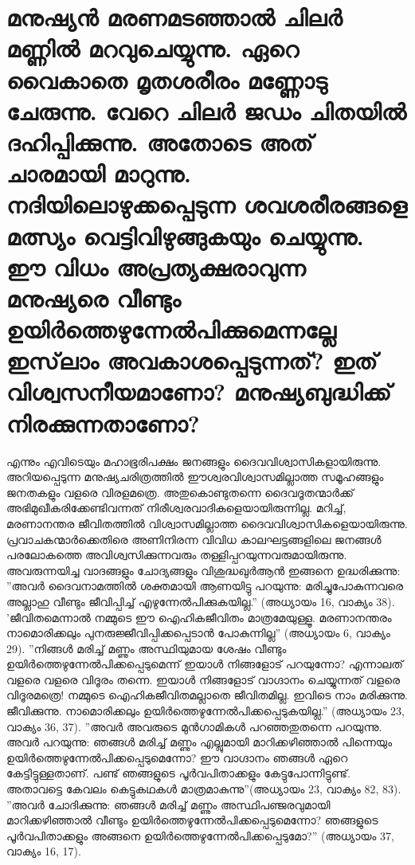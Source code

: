   \section{മനുഷ്യന്‍ മരണമടഞ്ഞാല്‍ ചിലര്‍ മണ്ണില്‍ മറവുചെയ്യുന്നു. ഏറെ വൈകാതെ മൃതശരീരം മണ്ണോടു ചേരുന്നു. വേറെ ചിലര്‍ ജഡം ചിതയില്‍ ദഹിപ്പിക്കുന്നു. അതോടെ അത് ചാരമായി മാറുന്നു. നദിയിലൊഴുക്കപ്പെടുന്ന ശവശരീരങ്ങളെ മത്സ്യം വെട്ടിവിഴുങ്ങുകയും ചെയ്യുന്നു. ഈ വിധം അപ്രത്യക്ഷരാവുന്ന മനുഷ്യരെ വീണ്ടും ഉയിര്‍ത്തെഴുന്നേല്‍പിക്കുമെന്നല്ലേ ഇസ്‌ലാം അവകാശപ്പെടുന്നത്? ഇത് വിശ്വസനീയമാണോ? മനുഷ്യബുദ്ധിക്ക് നിരക്കുന്നതാണോ?}
 എന്നും എവിടെയും മഹാഭൂരിപക്ഷം ജനങ്ങളും ദൈവവിശ്വാസികളായിരുന്നു. അറിയപ്പെടുന്ന മനുഷ്യചരിത്രത്തില്‍ ഈശ്വരവിശ്വാസമില്ലാത്ത സമൂഹങ്ങളും ജനതകളും വളരെ വിരളമത്രെ. അതുകൊണ്ടുതന്നെ ദൈവദൂതന്മാര്‍ക്ക് അഭിമുഖീകരിക്കേണ്ടിവന്നത് നിരീശ്വരവാദികളെയായിരുന്നില്ല. മറിച്ച്, മരണാനന്തര ജീവിതത്തില്‍ വിശ്വാസമില്ലാത്ത ദൈവവിശ്വാസികളെയായിരുന്നു. പ്രവാചകന്മാര്‍ക്കെതിരെ അണിനിരന്ന വിവിധ കാലഘട്ടങ്ങളിലെ ജനങ്ങള്‍ പരലോകത്തെ അവിശ്വസിക്കുന്നവരും തള്ളിപ്പറയുന്നവരുമായിരുന്നു. അവരുന്നയിച്ച വാദങ്ങളും ചോദ്യങ്ങളും വിശുദ്ധഖുര്‍ആന്‍ ഇങ്ങനെ ഉദ്ധരിക്കുന്നു:
''അവര്‍ ദൈവനാമത്തില്‍ ശക്തമായി ആണയിട്ടു പറയുന്നു: മരിച്ചുപോകുന്നവരെ അല്ലാഹു വീണ്ടും ജീവിപ്പിച്ച് എഴുന്നേല്‍പിക്കുകയില്ല.'' (അധ്യായം 16, വാക്യം 38).
'ജീവിതമെന്നാല്‍ നമ്മുടെ ഈ ഐഹികജീവിതം മാത്രമേയുള്ളൂ. മരണാനന്തരം നാമൊരിക്കലും പുനരുജ്ജീവിപ്പിക്കപ്പെടാന്‍ പോകുന്നില്ല'' (അധ്യായം 6, വാക്യം 29).
''നിങ്ങള്‍ മരിച്ച് മണ്ണും അസ്ഥിയുമായ ശേഷം വീണ്ടും ഉയിര്‍ത്തെഴുന്നേല്‍പിക്കപ്പെടുമെന്ന് ഇയാള്‍ നിങ്ങളോട് പറയുന്നോ? എന്നാലത് വളരെ വളരെ വിദൂരം തന്നെ. ഇയാള്‍ നിങ്ങളോട് വാഗ്ദാനം ചെയ്യുന്നത് വളരെ വിദൂരമത്രെ! നമ്മുടെ ഐഹികജീവിതമല്ലാതെ ജീവിതമില്ല. ഇവിടെ നാം മരിക്കുന്നു. ജീവിക്കുന്നു. നാമൊരിക്കലും ഉയിര്‍ത്തെഴുന്നേല്‍പിക്കപ്പെടുകയില്ല.'' (അധ്യായം 23, വാക്യം 36, 37).
''അവര്‍ അവരുടെ മുന്‍ഗാമികള്‍ പറഞ്ഞതുതന്നെ പറയുന്നു. അവര്‍ പറയുന്നു: ഞങ്ങള്‍ മരിച്ച് മണ്ണും എല്ലുമായി മാറിക്കഴിഞ്ഞാല്‍ പിന്നെയും ഉയിര്‍ത്തെഴുന്നേല്‍പിക്കപ്പെടുമെന്നോ? ഈ വാഗ്ദാനം ഞങ്ങള്‍ ഏറെ കേട്ടിട്ടുള്ളതാണ്. പണ്ട് ഞങ്ങളുടെ പൂര്‍വപിതാക്കളും കേട്ടുപോന്നിട്ടുണ്ട്. അതാവട്ടെ കേവലം കെട്ടുകഥകള്‍ മാത്രമാകുന്നു''(അധ്യായം 23, വാക്യം 82, 83).
''അവര്‍ ചോദിക്കുന്നു: ഞങ്ങള്‍ മരിച്ച് മണ്ണും അസ്ഥിപഞ്ജരവുമായി മാറിക്കഴിഞ്ഞാല്‍ വീണ്ടും ഉയിര്‍ത്തെഴുന്നേല്‍പിക്കപ്പെടുമെന്നോ? ഞങ്ങളുടെ പൂര്‍വപിതാക്കളും അങ്ങനെ ഉയിര്‍ത്തെഴുന്നേല്‍പിക്കപ്പെടുമോ?'' (അധ്യായം 37, വാക്യം 16, 17).
